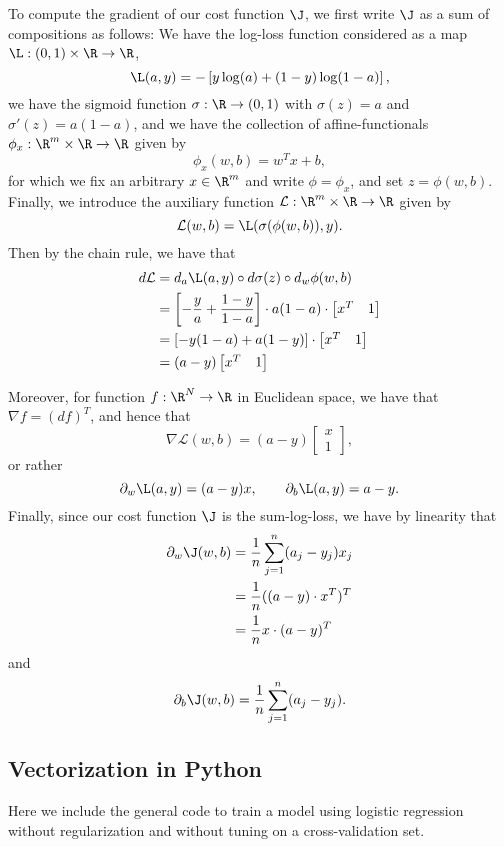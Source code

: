 To compute the gradient of our cost function $\J$, we first write $\J$ as a sum of compositions as follows:  We have the log-loss function considered as a map $\L:(0,1)\times\R\to\R$,
$$\L(a,y)=-\left[y\log(a)+(1-y)\log(1-a)\right],$$
we have the sigmoid function $\sigma:\R\to(0,1)$ with $\sigma(z)=a$ and $\sigma'(z)=a(1-a)$, and we have the collection of affine-functionals $\phi_x:\R^m\times\R\to\R$ given by
$$\phi_x(w,b)=w^Tx+b,$$
for which we fix an arbitrary $x\in\R^m$ and write $\phi=\phi_x$, and set $z=\phi(w,b)$.  Finally, we introduce the auxiliary function $\mathcal{L}:\R^m\times\R\to\R$ given by
$$\mathcal{L}(w,b)=\L(\sigma(\phi(w,b)),y).$$
Then by the chain rule, we have that
\begin{align*}
	d\mathcal{L}&=d_a\L(a,y)\circ d\sigma(z)\circ d_w\phi(w,b)\\
	&=\left[-\frac{y}{a}+\frac{1-y}{1-a}\right]\cdot a(1-a)\cdot\begin{bmatrix}
		x^T&1
	\end{bmatrix}\\
	&=[-y(1-a)+a(1-y)]\cdot \begin{bmatrix}
		x^T&1
	\end{bmatrix}\\
	&=(a-y)\begin{bmatrix}
		x^T&1
	\end{bmatrix}
\end{align*}

Moreover, for function $f:\R^N\to\R$ in Euclidean space, we have that $\nabla f = (df)^T$, and hence that
$$\nabla\mathcal{L}(w,b)=(a-y)\begin{bmatrix}
	x\\
	1
\end{bmatrix},$$
or rather
$$\partial_w\L(a,y)=(a-y)x,\qquad \partial_b\L(a,y)=a-y.$$
Finally, since our cost function $\J$ is the sum-log-loss, we have by linearity that
\begin{align*}
	\partial_w\J(w,b)&=\frac{1}{n}\sum_{j=1}^n(a_j-y_j)x_j\\
	&=\frac{1}{n}((a-y)\cdot x^T)^T\\
	&=\frac{1}{n}x\cdot(a-y)^T
\end{align*}
and
$$\partial_b\J(w,b)=\frac{1}{n}\sum_{j=1}^n(a_j-y_j).$$


\subsection{Vectorization in Python}
Here we include the general code to train a model using logistic regression without regularization and without tuning on a cross-validation set.

